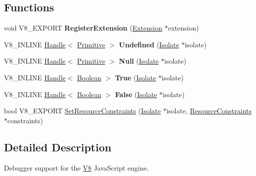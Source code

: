 \subsection*{Functions}
\begin{DoxyCompactItemize}
\item 
\hypertarget{namespacev8_a50b91e1100a42cc12e7295b22d44d9d0}{void V8\-\_\-\-E\-X\-P\-O\-R\-T {\bfseries Register\-Extension} (\hyperlink{classv8_1_1Extension}{Extension} $\ast$extension)}\label{namespacev8_a50b91e1100a42cc12e7295b22d44d9d0}

\item 
\hypertarget{namespacev8_af7d2f7fc42d6873af561b885151168d7}{V8\-\_\-\-I\-N\-L\-I\-N\-E \hyperlink{classv8_1_1Handle}{Handle}$<$ \hyperlink{classv8_1_1Primitive}{Primitive} $>$ {\bfseries Undefined} (\hyperlink{classv8_1_1Isolate}{Isolate} $\ast$isolate)}\label{namespacev8_af7d2f7fc42d6873af561b885151168d7}

\item 
\hypertarget{namespacev8_ad3e6b3f6b548745a461b71f3bfb17ef1}{V8\-\_\-\-I\-N\-L\-I\-N\-E \hyperlink{classv8_1_1Handle}{Handle}$<$ \hyperlink{classv8_1_1Primitive}{Primitive} $>$ {\bfseries Null} (\hyperlink{classv8_1_1Isolate}{Isolate} $\ast$isolate)}\label{namespacev8_ad3e6b3f6b548745a461b71f3bfb17ef1}

\item 
\hypertarget{namespacev8_acbc2c4a2a277e913ae100014559f6030}{V8\-\_\-\-I\-N\-L\-I\-N\-E \hyperlink{classv8_1_1Handle}{Handle}$<$ \hyperlink{classv8_1_1Boolean}{Boolean} $>$ {\bfseries True} (\hyperlink{classv8_1_1Isolate}{Isolate} $\ast$isolate)}\label{namespacev8_acbc2c4a2a277e913ae100014559f6030}

\item 
\hypertarget{namespacev8_aa2d11aede58f5b3b0c2abe92f9c8ee40}{V8\-\_\-\-I\-N\-L\-I\-N\-E \hyperlink{classv8_1_1Handle}{Handle}$<$ \hyperlink{classv8_1_1Boolean}{Boolean} $>$ {\bfseries False} (\hyperlink{classv8_1_1Isolate}{Isolate} $\ast$isolate)}\label{namespacev8_aa2d11aede58f5b3b0c2abe92f9c8ee40}

\item 
bool V8\-\_\-\-E\-X\-P\-O\-R\-T \hyperlink{namespacev8_a997a1351c3db4d60f3599e1c2f5d13c2}{Set\-Resource\-Constraints} (\hyperlink{classv8_1_1Isolate}{Isolate} $\ast$isolate, \hyperlink{classv8_1_1ResourceConstraints}{Resource\-Constraints} $\ast$constraints)
\end{DoxyCompactItemize}


\subsection{Detailed Description}
Debugger support for the \hyperlink{classv8_1_1V8}{V8} Java\-Script engine.

